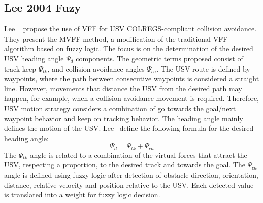     \subsection{Lee 2004 Fuzy}
    Lee \etal~\cite{Lee2004Fuzzy} propose the use of \ac{VFF}\cite{Borenstein1989Real} for \ac{USV} \ac{COLREGS}-compliant collision avoidance. They present the \ac{MVFF} method, a modification of the traditional \ac{VFF} algorithm based on fuzzy logic. The focus is on the determination of the desired \ac{USV} heading angle $\Psi_d$ components. The geometric terms proposed consist of track-keep $\Psi_{tk}$, and collision avoidance angles $\Psi_{ca}$. 
    The \ac{USV} route is defined by waypoints, where the path between consecutive waypoints is considered a straight line. However, movements that distance the \ac{USV} from the desired path may happen, for example, when a collision avoidance movement is required. Therefore, \ac{USV} motion strategy considers a combination of go towards the goal/next waypoint behavior and keep on tracking behavior. The heading angle mainly defines the motion of the \ac{USV}. Lee \etal~define the following formula for the desired heading angle:
    \begin{equation}
    \Psi_d = \Psi_{tk} + \Psi_{ca}
    \end{equation}
    The $\Psi_{tk}$ angle is related to a combination of the virtual forces that attract the \ac{USV}, respecting a proportion, to the desired track and towards the goal. The $\Psi_{ca}$ angle is defined using fuzzy logic after detection of obstacle direction, orientation, distance, relative velocity and position relative to the \ac{USV}. Each detected value is translated into a weight for fuzzy logic decision. 
    
